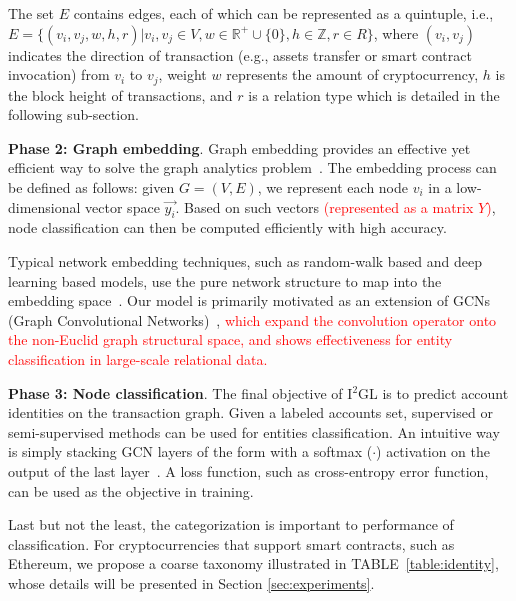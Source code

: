 The set $E$ contains edges, each of which can be represented as a quintuple, i.e., $E=\{(v_i,v_j,w,h,r)|v_i,v_j \in V, w\in \mathbb{R}^+ \cup\{0\}, h\in \mathbb{Z}, r\in R\}$, where $(v_{i},v_{j})$ indicates the direction of transaction (e.g., assets transfer or smart contract invocation) from $v_i$ to $v_j$, weight $w$ represents the amount of cryptocurrency, $h$ is the block height of transactions, and $r$ is a relation type which is detailed in the following sub-section.


\textbf{Phase 2: Graph embedding}.
Graph embedding provides an effective yet efficient way to solve the graph analytics problem~\cite{cai2018comprehensive}. The embedding process can be defined as follows: given $G=(V,E)$, we represent each node $v_{i}$ in a low-dimensional vector space $\vec{y_i}$. Based on such vectors \textcolor{red}{(represented as a matrix $Y$)}, node classification can then be computed efficiently with high accuracy.

Typical network embedding techniques, such as random-walk based and deep learning based models, use the pure network structure to map into the embedding space~\cite{goyal2018capturing}. Our model is primarily motivated as an extension of GCNs (Graph Convolutional Networks)~\cite{kipf2016semi,schlichtkrull2018modeling}, \textcolor{red}{which expand the convolution operator onto the non-Euclid graph structural space, and shows effectiveness for entity classification in large-scale relational data.}

\textbf{Phase 3: Node classification}.
The final objective of I$^2$GL is to predict account identities on the transaction graph. Given a labeled accounts set, supervised or semi-supervised methods can be used for entities classification. An intuitive way is simply stacking GCN layers of the form with a softmax ($\cdot$) activation on the output of the last layer~\cite{schlichtkrull2018modeling}. A loss function, such as cross-entropy error function, can be used as the objective in training.

Last but not the least, the categorization is important to performance of classification. For cryptocurrencies that support smart contracts, such as Ethereum, we propose a coarse taxonomy illustrated in TABLE~\ref{table:identity}, whose details will be presented in Section \ref{sec:experiments}.


